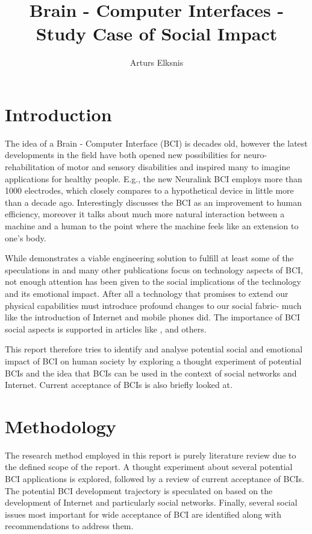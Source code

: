 \documentclass[fleqn,11pt]{olplainarticle}
\title{Brain - Computer Interfaces - Study Case of Social Impact}
\author[1]{Arturs Elksnis}
\begin{document}
\flushbottom
\maketitle
\thispagestyle{empty}

\section{Introduction}
The idea of a Brain - Computer Interface (BCI) is decades old, however the latest developments in the field have both opened new possibilities for neuro-rehabilitation of motor and sensory disabilities and inspired many to imagine applications for healthy people. E.g., the new Neuralink BCI \cite{musk2019integrated} employs more than 1000 electrodes, which closely compares to a hypothetical device in \cite{schalk2008brain} little more than a decade ago. Interestingly \cite{schalk2008brain} discusses the BCI as an improvement to human efficiency, moreover it talks about much more natural interaction between a machine and a human to the point where the machine feels like an extension to one's body.

While \cite{musk2019integrated} demonstrates a viable engineering solution to fulfill at least some of the speculations in \cite{schalk2008brain} and many other publications focus on technology aspects of BCI, not enough attention has been given to the social implications of the technology and its emotional impact. After all a technology that promises to extend our physical capabilities must introduce profound changes to our social fabric- much like the introduction of Internet and mobile phones did. The importance of BCI social aspects is supported in articles like \cite{sexton2015overlooked}, \cite{kogel2019using} and others.

This report therefore tries to identify and analyse potential social and emotional impact of BCI on human society by exploring a thought experiment of potential BCIs and the idea that BCIs can be used in the context of social networks and Internet. Current acceptance of BCIs is also briefly looked at.

\section{Methodology}
The research method employed in this report is purely literature review due to the defined scope of the report. A thought experiment about several potential BCI applications is explored, followed by a review of current acceptance of BCIs. The potential BCI development trajectory is speculated on based on the development of Internet and particularly social networks. Finally, several social issues most important for wide acceptance of BCI are identified along with recommendations to address them.
\end{document}
